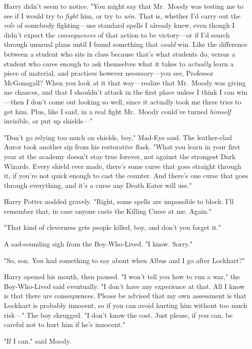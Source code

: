 Harry didn't seem to notice. "You might say that Mr.~Moody was testing me to
see if I would try to \emph{fight} him, or try to \emph{win.} That is, whether
I'd carry out the \emph{role} of somebody fighting---use standard spells I
already knew, even though I didn't expect the \emph{consequences} of that
action to be victory---or if I'd search through unusual plans until I found
something that \emph{could} win. Like the difference between a student who sits
in class because that's what students do, versus a student who cares enough to
ask themselves what it takes to \emph{actually} learn a piece of material, and
practices however necessary---you see, Professor McGonagall? When you look at
it that way---realize that Mr.~Moody was giving me chances, and that I
shouldn't attack in the first place unless I think I can win---then I don't
come out looking so well, since it actually took me three tries to get him.
Plus, like I said, in a real fight Mr.~Moody could've turned \emph{himself}
invisible, or put up shields---"

"Don't go relying too much on shields, boy," Mad-Eye said. The leather-clad
Auror took another sip from his restorative flask. "What you learn in your
first year at the academy doesn't stay true forever, not against the strongest
Dark Wizards. Every shield ever made, there's some curse that goes straight
through it, if you're not quick enough to cast the counter. And there's one
curse that goes through everything, and it's a curse any Death Eater will use."

Harry Potter nodded gravely. "Right, some spells are impossible to block. I'll
remember that, in case anyone casts the Killing Curse at me. Again."

"That kind of cleverness gets people killed, boy, and don't you forget it."

A sad-sounding sigh from the Boy-Who-Lived. "I know. Sorry."

"So, son. You had something to say about when Albus and I go after Lockhart?"

Harry opened his mouth, then paused. "I won't tell you how to run a war," the
Boy-Who-Lived said eventually. "I don't have any experience at that. All I know
is that there are consequences. Please be advised that my own assessment is
that Lockhart is probably innocent, so if you can avoid hurting him without too
much risk---" The boy shrugged. "I don't know the cost. Just please, if you
can, be careful not to hurt him if he's innocent."

"If I can," said Moody.

